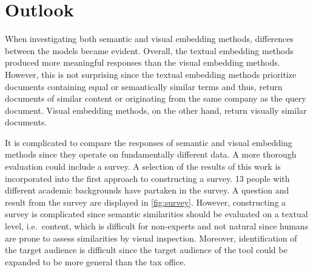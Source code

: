 \chapter{Outlook}\label{ch:outlook}

When investigating both semantic and visual embedding methods, differences between the models became evident.
Overall, the textual embedding methods produced more meaningful responses than the visual embedding methods.
However, this is not surprising since the textual embedding methods prioritize documents containing equal or semantically similar terms and thus,
return documents of similar content or originating from the same company as the query document.
Visual embedding methods, on the other hand, return visually similar documents.

It is complicated to compare the responses of semantic and visual embedding methods since they operate on fundamentally different data.
A more thorough evaluation could include a survey.
A selection of the results of this work is incorporated into the first approach to constructing a survey.
13 people with different academic backgrounds have partaken in the survey.
A question and result from the survey are displayed in \autoref{fig:survey}.
However, constructing a survey is complicated since semantic similarities should be evaluated on a textual level, i.e.\ content, 
which is difficult for non-experts and not natural since humans are prone to assess similarities by visual inspection.
Moreover, identification of the target audience is difficult since the target audience of the tool could be expanded to be more general than the tax office.

